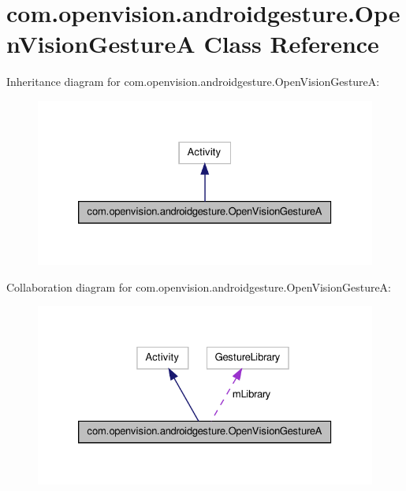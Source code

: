 \hypertarget{classcom_1_1openvision_1_1androidgesture_1_1_open_vision_gesture_a}{\section{com.\-openvision.\-androidgesture.\-Open\-Vision\-Gesture\-A \-Class \-Reference}
\label{classcom_1_1openvision_1_1androidgesture_1_1_open_vision_gesture_a}
}


\-Inheritance diagram for com.\-openvision.\-androidgesture.\-Open\-Vision\-Gesture\-A\-:
\nopagebreak
\begin{figure}[H]
\begin{center}
\leavevmode
\includegraphics[width=326pt]{classcom_1_1openvision_1_1androidgesture_1_1_open_vision_gesture_a__inherit__graph}
\end{center}
\end{figure}


\-Collaboration diagram for com.\-openvision.\-androidgesture.\-Open\-Vision\-Gesture\-A\-:
\nopagebreak
\begin{figure}[H]
\begin{center}
\leavevmode
\includegraphics[width=326pt]{classcom_1_1openvision_1_1androidgesture_1_1_open_vision_gesture_a__coll__graph}
\end{center}
\end{figure}
